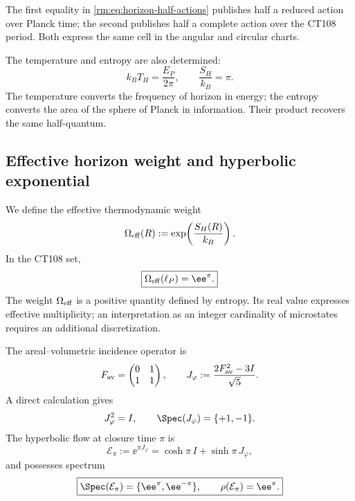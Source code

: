 The first equality in \cref{rm:eq:horizon-half-actions} publishes half a reduced action
over Planck time; the second publishes half a complete action
over the CT108 period. Both express the same cell in the angular
and circular charts.

The temperature and entropy are also determined:
\begin{equation}
 k_BT_H=\frac{E_P}{2\pi},
 \qquad
 \boxed{\frac{S_H}{k_B}=\pi.}
 \label{rm:eq:horizon-CT108-TS}
\end{equation}
The temperature converts the frequency of horizon in energy; the
entropy converts the area of the sphere of Planck in information. Their
product recovers the same half-quantum.

\subsection{Effective horizon weight and hyperbolic exponential}

We define the effective thermodynamic weight
\begin{equation}
 \Omega_{\rm eff}(R):=\exp\!\left(\frac{S_H(R)}{k_B}\right).
 \label{rm:eq:horizon-effective-weight}
\end{equation}
In the CT108 set,
\begin{equation}
 \boxed{\Omega_{\rm eff}(\ell_P)=\ee^\pi.}
 \label{rm:eq:horizon-effective-e-pi}
\end{equation}
The weight \(\Omega_{\rm eff}\) is a positive quantity defined by
entropy. Its real value expresses effective multiplicity; an interpretation
as an integer cardinality of microstates requires an additional discretization.

The areal--volumetric incidence operator is
\begin{equation}
 F_{\rm av}=\begin{pmatrix}0&1\\1&1\end{pmatrix},
 \qquad
 J_\varphi:=\frac{2F_{\rm av}^2-3I}{\sqrt5}.
 \label{rm:eq:horizon-J-phi}
\end{equation}
A direct calculation gives
\begin{equation}
 J_\varphi^2=I,
 \qquad
 \Spec(J_\varphi)=\{+1,-1\}.
 \label{rm:eq:horizon-J-involution}
\end{equation}
The hyperbolic flow at closure time \(\pi\) is
\begin{equation}
 \mathcal E_\pi
 :=\ee^{\pi J_\varphi}
 =\cosh\pi\,I+\sinh\pi\,J_\varphi,
 \label{rm:eq:horizon-hyperbolic-flow}
\end{equation}
and possesses spectrum
\begin{equation}
 \boxed{
 \Spec(\mathcal E_\pi)=\{\ee^\pi,\ee^{-\pi}\},
 \qquad
 \rho(\mathcal E_\pi)=\ee^\pi.}
 \label{rm:eq:horizon-hyperbolic-spectrum}
\end{equation}

